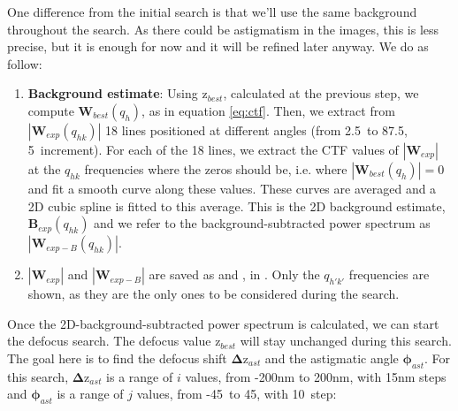 One difference from the initial search is that we'll use the same background throughout the search. As there could be astigmatism in the images, this is less precise, but it is enough for now and it will be refined later anyway. We do as follow:
\begin{enumerate}
    \item \textbf{Background estimate}: Using $\bm{\mathrm{z}}_{best}$, calculated at the previous step, we compute $\bm{W}_{best}(q_h)$, as in equation \ref{eq:ctf}. Then, we extract from $|\bm{W}_{exp}(q_{hk})|$ 18 lines positioned at different angles (from 2.5\textdegree\ to 87.5\textdegree, 5\textdegree\ increment). For each of the 18 lines, we extract the CTF values of $|\bm{W}_{exp}|$ at the $q_{hk}$ frequencies where the zeros should be, i.e. where $|\bm{W}_{best}(q_{h})|=0$ and fit a smooth curve along these values. These curves are averaged and a 2D cubic spline is fitted to this average. This is the 2D background estimate, $\bm{B}_{exp}(q_{hk})$ and we refer to the background-subtracted power spectrum as $|\bm{W}_{exp-B}(q_{hk})|$.
        
    \item $|\bm{W}_{exp}|$ and $|\bm{W}_{exp-B}|$ are saved as  and , in . Only the $q_{h'k'}$ frequencies are shown, as they are the only ones to be considered during the search.
\end{enumerate}
    
Once the 2D-background-subtracted power spectrum is calculated, we can start the defocus search. The defocus value $\bm{\mathrm{z}}_{best}$ will stay unchanged during this search. The goal here is to find the defocus shift $\bm{\Delta\mathrm{z}}_{ast}$ and the astigmatic angle $\bm{\phi}_{ast}$. For this search, $\bm{\Delta\mathrm{z}}_{ast}$ is a range of $i$ values, from -200nm to 200nm, with 15nm steps and $\bm{\phi}_{ast}$ is a range of $j$ values, from -45\textdegree\ to 45\textdegree, with 10\textdegree\ step:

